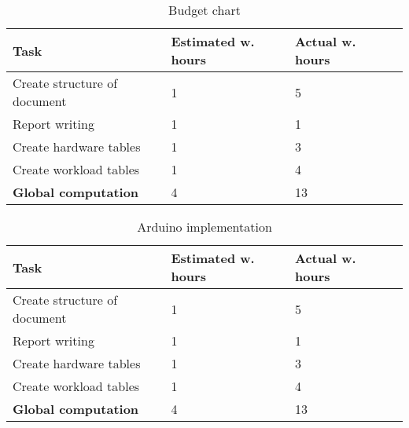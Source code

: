 \begin{table}[H]
\caption{Budget chart}
\begin{tabular}{llll}
\hline
                               \textbf{Task}    & \textbf{Estimated w. hours} & \textbf{Actual w. hours} \\ \hline
\rowcolor{lightgray}
Create structure of document                    & 1                           & 5                      \\
Report writing                                  & 1                           & 1                      \\
\rowcolor{lightgray}
Create hardware tables                          & 1                           & 3                     \\
Create workload tables                          & 1                           & 4                      \\
\rowcolor{lightgray}
\textbf{Global computation}                     & 4                          & 13                     \\
\end{tabular}
\end{table}

\begin{table}[H]
\caption{Arduino implementation}
\begin{tabular}{llll}
\hline
                               \textbf{Task}    & \textbf{Estimated w. hours} & \textbf{Actual w. hours} \\ \hline
\rowcolor{lightgray}
Create structure of document                    & 1                           & 5                      \\
Report writing                                  & 1                           & 1                      \\
\rowcolor{lightgray}
Create hardware tables                          & 1                           & 3                     \\
Create workload tables                          & 1                           & 4                      \\
\rowcolor{lightgray}
\textbf{Global computation}                     & 4                          & 13                     \\
\end{tabular}
\end{table}

